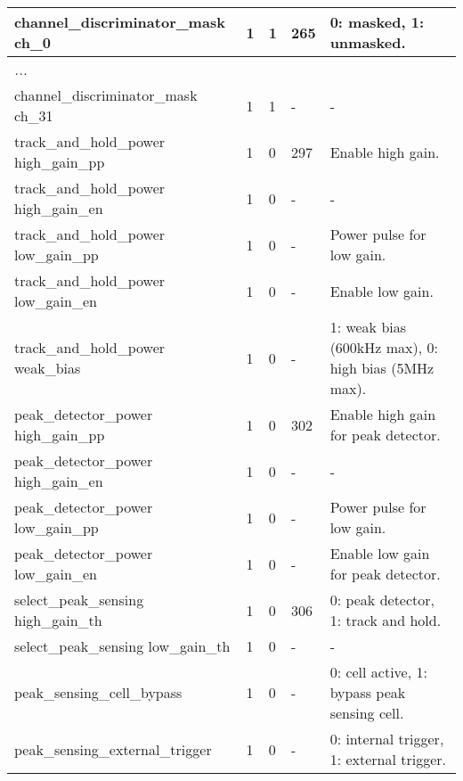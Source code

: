 \begin{longtable}{|p{6cm}|p{1cm}|p{1.4cm}|p{1.8cm}|p{5cm}|}
channel\_discriminator\_mask ch\_0 & 1  & 1 & 265 & 0: masked, 1: unmasked. \\ \hline
\multicolumn{5}{|l|}{\emph{...}} \\ \hline
channel\_discriminator\_mask ch\_31 & 1  & 1 & - & - \\ \hline

track\_and\_hold\_power high\_gain\_pp & 1  & 0 & 297 & Enable high gain. \\ \hline
track\_and\_hold\_power high\_gain\_en & 1  & 0 & -   & - \\ \hline
track\_and\_hold\_power low\_gain\_pp  & 1  & 0 & -   & Power pulse for low gain. \\ \hline
track\_and\_hold\_power low\_gain\_en  & 1  & 0 & -   & Enable low gain. \\ \hline
track\_and\_hold\_power weak\_bias     & 1  & 0 & -   & 1: weak bias (600kHz max), 0: high bias (5MHz max). \\ \hline

peak\_detector\_power high\_gain\_pp & 1  & 0 & 302 & Enable high gain for peak detector. \\ \hline
peak\_detector\_power high\_gain\_en & 1  & 0 & - & - \\ \hline
peak\_detector\_power low\_gain\_pp  & 1  & 0 & - & Power pulse for low gain. \\ \hline
peak\_detector\_power low\_gain\_en  & 1  & 0 & - & Enable low gain for peak detector. \\ \hline

select\_peak\_sensing high\_gain\_th & 1  & 0 & 306 & 0: peak detector, 1: track and hold. \\ \hline
select\_peak\_sensing low\_gain\_th  & 1  & 0 & -   & - \\ \hline
peak\_sensing\_cell\_bypass          & 1  & 0 & -   & 0: cell active, 1: bypass peak sensing cell. \\ \hline
peak\_sensing\_external\_trigger     & 1  & 0 & -   & 0: internal trigger, 1: external trigger. \\ \hline


\end{longtable}
